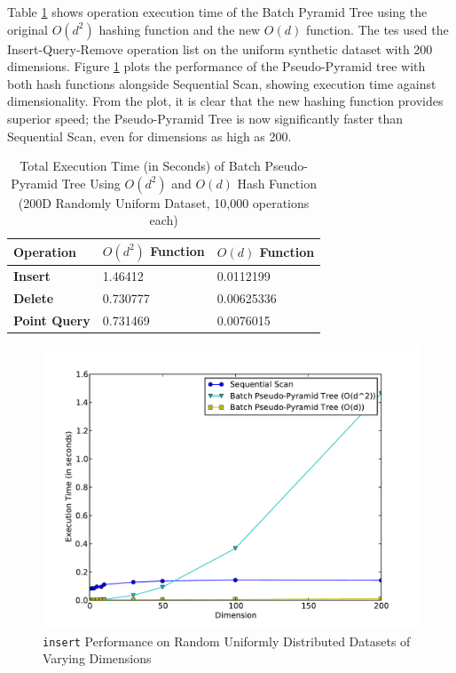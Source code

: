 Table \ref{tab:new-pseudo-pyramid-hash} shows operation execution time of the Batch Pyramid Tree using the original $O(d^2)$ hashing function and the new $O(d)$ function. The tes used the Insert-Query-Remove operation list on the uniform synthetic dataset with 200 dimensions. Figure \ref{fig:new-pseudo-pyramid-hash} plots the performance of the Pseudo-Pyramid tree with both hash functions alongside Sequential Scan, showing execution time against dimensionality. From the plot, it is clear that the new hashing function provides superior speed; the Pseudo-Pyramid Tree is now significantly faster than Sequential Scan, even for dimensions as high as 200.

\begin{table}
	\centering
	\begin{tabular}{|l|l|l|}
		\hline
		\textbf{Operation} & \textbf{$O(d^2)$ Function} & \textbf{$O(d)$ Function} \\
		\hline
		\textbf{Insert} & 1.46412 & 0.0112199 \\
		\textbf{Delete} & 0.730777 & 0.00625336 \\
		\textbf{Point Query} & 0.731469 & 0.0076015 \\
		\hline
	\end{tabular}
	\caption{Total Execution Time (in Seconds) of Batch Pseudo-Pyramid Tree Using $O(d^2)$ and $O(d)$ Hash Function (200D Randomly Uniform Dataset, 10,000 operations each)}
	\label{tab:new-pseudo-pyramid-hash}
\end{table}

\begin{figure}
	\centering
	\includegraphics[scale=0.5]{figures/performance_analysis/iteration_2/new_pseudo-pyramid_hash_performance.pdf}
	\caption{\texttt{insert} Performance on Random Uniformly Distributed Datasets of Varying Dimensions}
	\label{fig:new-pseudo-pyramid-hash}
\end{figure}

